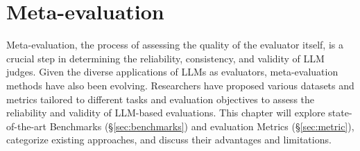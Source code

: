 \section{Meta-evaluation}
\label{sec:Meta}
Meta-evaluation, the process of assessing the quality of the evaluator itself, is a crucial step in determining the reliability, consistency, and validity of LLM judges. Given the diverse applications of LLMs as evaluators, meta-evaluation methods have also been evolving. Researchers have proposed various datasets and metrics tailored to different tasks and evaluation objectives to assess the reliability and validity of LLM-based evaluations. This chapter will explore state-of-the-art Benchmarks (\S\ref{sec:benchmarks}) and evaluation Metrics (\S\ref{sec:metric}), categorize existing approaches, and discuss their advantages and limitations.



